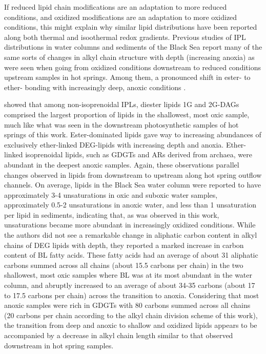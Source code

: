 If reduced lipid chain modifications are an adaptation to more reduced conditions, and oxidized modifications are an adaptation to more oxidized conditions, this might explain why similar lipid distributions have been reported along both thermal and isoothermal redox gradients. Previous studies of IPL distributions in water columns and sediments of the Black Sea report many of the same sorts of changes in alkyl chain structure with depth (increasing anoxia) as were seen when going from oxidized conditions downstream to reduced conditions upstream samples in hot springs. Among them, a pronounced shift in ester- to ether- bonding with increasingly deep, anoxic conditions \citep{schroder2015intact, schubotz2009detection}.

\cite{schroder2015intact} showed that among non-isoprenoidal IPLs, diester lipids 1G and 2G-DAGs comprised the largest proportion of lipids in the shallowest, most oxic sample, much like what was seen in the downstream photosynthetic samples of hot springs of this work. Ester-dominated lipids gave way to increasing abundances of exclusively ether-linked DEG-lipids with increasing depth and anoxia. Ether-linked isoprenoidal lipids, such as GDGTs and ARs derived from archaea, were abundant in the deepest anoxic samples. Again, these observations parallel changes observed in lipids from downstream to upstream along hot spring outflow channels. On average, lipids in the Black Sea water column were reported to have approximately 3-4 unsaturations in oxic and suboxic water samples, approximately 0.5-2 unsaturations in anoxic water, and less than 1 unsaturation per lipid in sediments, indicating that, as was observed in this work, unsaturations became more abundant in increasingly oxidized conditions. While the authors did not see a remarkable change in aliphatic carbon content in alkyl chains of DEG lipids with depth, they reported a marked increase in carbon content of BL fatty acids. These fatty acids had an average of about 31 aliphatic carbons summed across all chains (about 15.5 carbons per chain) in the two shallowest, most oxic samples where BL was at its most abundant in the water column, and abruptly increased to an average of about 34-35 carbons (about 17 to 17.5 carbons per chain) across the transition to anoxia. Considering that most anoxic samples were rich in GDGTs with 80 carbons summed across all chains (20 carbons per chain according to the alkyl chain division scheme of this work), the transition from deep and anoxic to shallow and oxidized lipids appears to be accompanied by a decrease in alkyl chain length similar to that observed downstream in hot spring samples.

